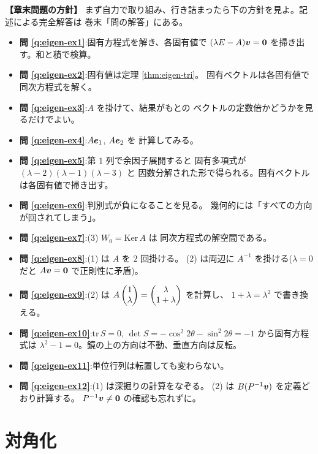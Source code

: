 \bigskip
{\small
\noindent\textbf{【章末問題の方針】}\quad
まず自力で取り組み、行き詰まったら下の方針を見よ。記述による完全解答は
巻末「問の解答」にある。
\begin{itemize}
\item \textbf{問 \ref{q:eigen-ex1}}:固有方程式を解き、各固有値で
$(\lambda E - A)\bm{v} = \bm{0}$ を掃き出す。和と積で検算。
\item \textbf{問 \ref{q:eigen-ex2}}:固有値は定理 \ref{thm:eigen-tri}。
固有ベクトルは各固有値で同次方程式を解く。
\item \textbf{問 \ref{q:eigen-ex3}}:$A$ を掛けて、結果がもとの
ベクトルの定数倍かどうかを見るだけでよい。
\item \textbf{問 \ref{q:eigen-ex4}}:$A\bm{e}_1$, $A\bm{e}_2$ を
計算してみる。
\item \textbf{問 \ref{q:eigen-ex5}}:第 $1$ 列で余因子展開すると
固有多項式が $(\lambda - 2)(\lambda - 1)(\lambda - 3)$ と
因数分解された形で得られる。固有ベクトルは各固有値で掃き出す。
\item \textbf{問 \ref{q:eigen-ex6}}:判別式が負になることを見る。
幾何的には「すべての方向が回されてしまう」。
\item \textbf{問 \ref{q:eigen-ex7}}:(3) $W_0 = \mathrm{Ker}\,A$ は
同次方程式の解空間である。
\item \textbf{問 \ref{q:eigen-ex8}}:(1) は $A$ を $2$ 回掛ける。
(2) は両辺に $A^{-1}$ を掛ける($\lambda = 0$ だと $A\bm{v} = \bm{0}$
で正則性に矛盾)。
\item \textbf{問 \ref{q:eigen-ex9}}:(2) は
$A\begin{pmatrix}1 \\ \lambda\end{pmatrix} = \begin{pmatrix}\lambda \\ 1 + \lambda\end{pmatrix}$ を計算し、
$1 + \lambda = \lambda^2$ で書き換える。
\item \textbf{問 \ref{q:eigen-ex10}}:$\mathrm{tr}\,S = 0$,
$\det S = -\cos^2 2\theta - \sin^2 2\theta = -1$ から固有方程式は
$\lambda^2 - 1 = 0$。鏡の上の方向は不動、垂直方向は反転。
\item \textbf{問 \ref{q:eigen-ex11}}:単位行列は転置しても変わらない。
\item \textbf{問 \ref{q:eigen-ex12}}:(1) は深掘りの計算をなぞる。
(2) は $B(P^{-1}\bm{v})$ を定義どおり計算する。
$P^{-1}\bm{v} \neq \bm{0}$ の確認も忘れずに。
\end{itemize}
}

\chapter{対角化}\label{chap:diag}


